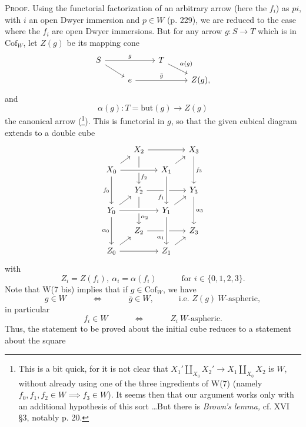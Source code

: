 \documentclass[11pt]{article}
\newcommand{\printedpage}[1]{\marginpar{\footnotesize p.~#1}}
\newcommand{\msp}[1]{\marginpar{\footnotesize [#1]}}
\newcommand{\Cof}{\mathrm{Cof}}
\begin{document}
\textsc{Proof.} Using the functorial factorization
\printedpage{173}
\msp{page 266}
of an arbitrary arrow (here the $f_i$) as $pi$, with $i$ an open Dwyer immersion and $p \in W$ (p. 229), we are reduced to the case where the $f_i$ are open Dwyer immersions. But for any arrow $g : S \longrightarrow T$ which is in $\Cof_W$, let $Z(g)$ be its mapping cone %
\[
\begin{tikzcd}[ampersand replacement=\&, row sep=small]
S \arrow[rr, "g"] \arrow[dr] \& \& T \arrow[dr, "\alpha(g)"] \& \\
 \& e \arrow[rr, "\bar{g}"] \& \& Z(g),
\end{tikzcd}
\]
and
\[
\alpha(g) : T = \mathrm{but}(g) \longrightarrow Z(g)
\]
the canonical arrow (\footnote[136]{This is a bit quick, for it is not clear that $X_1' \amalg_{X_0} X_2' \longrightarrow X_1 \amalg_{X_0} X_2$ is $W$, without already using one of the three ingredients of W(7) (namely $f_0, f_1, f_2 \in W \implies f_3 \in W$). It seems then that our argument works only with an additional hypothesis of this sort \dots But there is \textit{Brown's lemma,} cf. XVI \S3, notably p. 20.}). This is functorial in $g$, so that the given cubical diagram extends to a double cube
\[
\begin{tikzcd}[ampersand replacement=\&, row sep=small, column sep=small]
 \& X_2 \arrow[rr] \arrow[dd, "f_2" near end] \& \& X_3 \arrow[dd, "f_3"] \\
X_0 \arrow[ur] \arrow[rr, crossing over] \arrow[dd, "f_0"'] \& \& X_1 \arrow[ur] \& \\
 \& Y_2 \arrow[rr] \arrow[dd, "\alpha_2" near end] \& \& Y_3 \arrow[dd, "\alpha_3"] \\
Y_0 \arrow[ur] \arrow[rr, crossing over] \arrow[dd, "\alpha_0"'] \& \& Y_1 \arrow[ur] \arrow[from=uu, crossing over, "f_1"' near end] \& \\
 \& Z_2 \arrow[rr] \& \& Z_3 \\
Z_0 \arrow[ur] \arrow[rr] \& \& Z_1 \arrow[ur] \arrow[from=uu, crossing over, "\alpha_1"' near end] \&
\end{tikzcd}
\]
with
\[
Z_i = Z(f_i),\ \alpha_i = \alpha(f_i) \qquad\quad \text{for } i \in \{0,1,2,3\}.
\]
Note that W(7 bis) implies that if $g \in \Cof_W$,
\msp{page 267}
we have
\[
g \in W \qquad\quad \iff \qquad\quad \bar{g} \in W, \qquad\quad \text{i.e. } Z(g)\ W\text{-aspheric},
\]
in particular
\[
f_i \in W \qquad\quad \iff \qquad\quad Z_i\ W\text{-aspheric}.
\]
Thus, the statement to be proved about the initial cube reduces to a statement about the square
\end{document}
